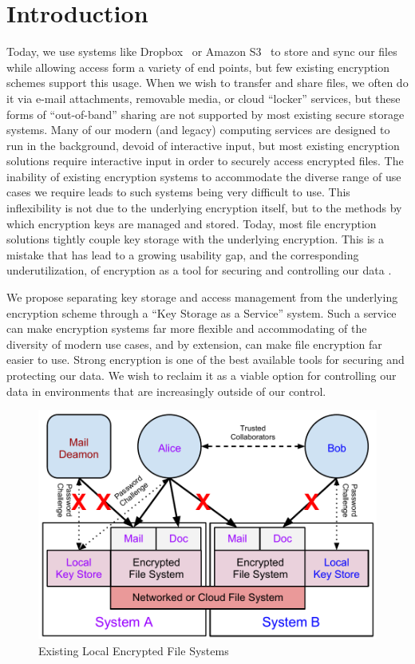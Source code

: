 \section{Introduction}
\label{sec:intro}

Today, we use systems like Dropbox~\cite{dropbox} or Amazon
S3~\cite{amazon-s3} to store and sync our files while allowing access
form a variety of end points, but few existing encryption schemes
support this usage. When we wish to transfer and share files, we often
do it via e-mail attachments, removable media, or cloud ``locker''
services, but these forms of ``out-of-band'' sharing are not supported
by most existing secure storage systems. Many of our modern (and
legacy) computing services are designed to run in the background,
devoid of interactive input, but most existing encryption solutions
require interactive input in order to securely access encrypted
files. The inability of existing encryption systems to accommodate the
diverse range of use cases we require leads to such systems being very
difficult to use. This inflexibility is not due to the underlying
encryption itself, but to the methods by which encryption keys are
managed and stored. Today, most file encryption solutions tightly
couple key storage with the underlying encryption. This is a mistake
that has lead to a growing usability gap, and the corresponding
underutilization, of encryption as a tool for securing and controlling
our data \cite{Whitten1999, Sweikata2009, Kher2005, Geambasu2011}.

We propose separating key storage and access management from the
underlying encryption scheme through a ``Key Storage as a Service''
system. Such a service can make encryption systems far more flexible
and accommodating of the diversity of modern use cases, and by
extension, can make file encryption far easier to use. Strong
encryption is one of the best available tools for securing and
protecting our data. We wish to reclaim it as a viable option for
controlling our data in environments that are increasingly outside of
our control.

\begin{figure}[!tb]
  \centering
  \includegraphics[width=\columnwidth]{./include/Problem-Layered.pdf}
  \caption{Existing Local Encrypted File Systems}
  \label{fig:problem-layered}
\end{figure}

